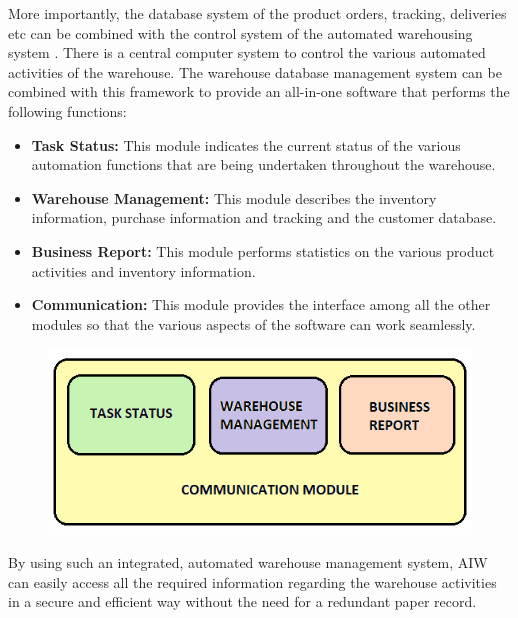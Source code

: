 \documentclass{report}
\begin{document}
More importantly, the database system of the product orders, tracking, deliveries etc can be combined with the control system of the automated warehousing system \cite{Deng2018DevelopmentOA}. There is a central computer system to control the various automated activities of the warehouse. The warehouse database management system can be combined with this framework to provide an all-in-one software that performs the following functions:

\begin{itemize}
    \item {\bfseries Task Status:}
    This module indicates the current status of the various automation functions that are being undertaken throughout the warehouse.
    \item {\bfseries Warehouse Management:}
    This module describes the inventory information, purchase information and tracking and the customer database.
    \item {\bfseries Business Report:} This module performs statistics on the various product activities and inventory information.
    \item {\bfseries Communication:} This module provides the interface among all the other modules so that the various aspects of the software can work seamlessly.
\end{itemize}

\begin{figure}[H]
    
    \centering
    \includegraphics[scale=0.5]{wms}
    \caption{}
    
\end{figure}

By using such an integrated, automated warehouse management system, AIW can easily access all the required information regarding the warehouse activities in a secure and efficient way without the need for a redundant paper record.
\end{document}
